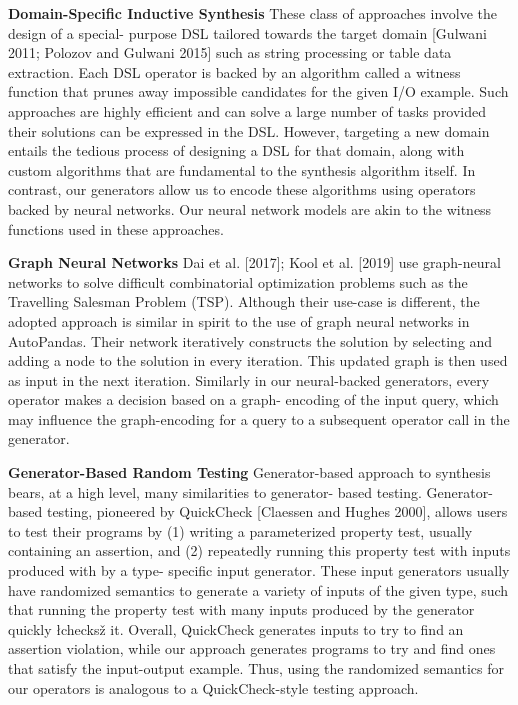 \documentclass{article}
\begin{document}
\textbf{Domain-Specific Inductive Synthesis}
These class of approaches involve the design of a special- purpose DSL tailored towards the target domain [Gulwani 2011; Polozov and Gulwani 2015] such as string processing or table data extraction. Each DSL operator is backed by an algorithm called a witness function that prunes away impossible candidates for the given I/O example. Such approaches are highly efficient and can solve a large number of tasks provided their solutions can be expressed in the DSL.
However, targeting a new domain entails the tedious process of designing a DSL for that domain, along with custom algorithms that are fundamental to the synthesis algorithm itself. In contrast, our generators allow us to encode these algorithms using operators backed by neural networks. Our neural network models are akin to the witness functions used in these approaches.

\textbf{Graph Neural Networks}
Dai et al. [2017]; Kool et al. [2019] use graph-neural networks to solve difficult combinatorial optimization problems such as the Travelling Salesman Problem (TSP). Although their use-case is different, the adopted approach is similar in spirit to the use of graph neural networks in AutoPandas. Their network iteratively constructs the solution by selecting and adding a node to the solution in every iteration. This updated graph is then used as input in the next iteration. Similarly in our neural-backed generators, every operator makes a decision based on a graph- encoding of the input query, which may influence the graph-encoding for a query to a subsequent operator call in the generator.

\textbf{Generator-Based Random Testing}
Generator-based approach to synthesis bears, at a high level, many similarities to generator- based testing. Generator-based testing, pioneered by QuickCheck [Claessen and Hughes 2000], allows users to test their programs by (1) writing a parameterized property test, usually containing an assertion, and (2) repeatedly running this property test with inputs produced with by a type- specific input generator. These input generators usually have randomized semantics to generate a variety of inputs of the given type, such that running the property test with many inputs produced by the generator quickly łchecksž it. Overall, QuickCheck generates inputs to try to find an assertion violation, while our approach generates programs to try and find ones that satisfy the input-output example. Thus, using the randomized semantics for our operators is analogous to a QuickCheck-style testing approach.
\end{document}
